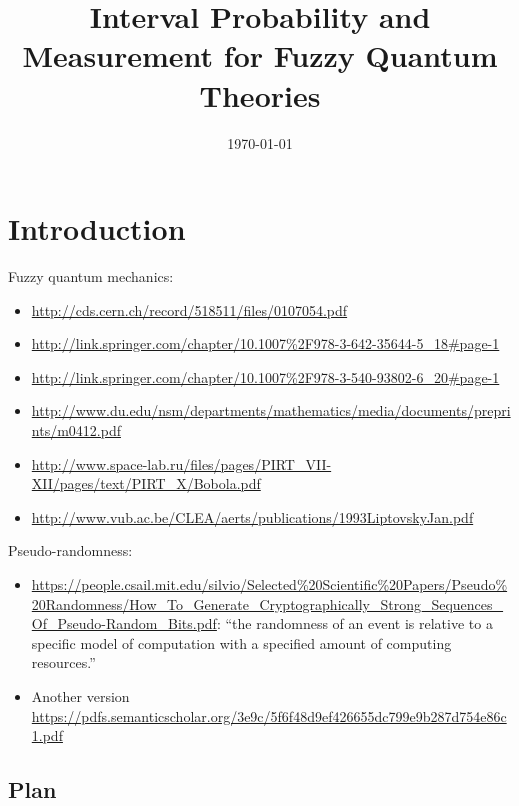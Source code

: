 \documentclass{article}
\theoremstyle{remark}
\begin{document}
\title{Interval Probability and Measurement for Fuzzy Quantum Theories}
\author{}
\date{\today}
\maketitle

\section{Introduction}
  
Fuzzy quantum mechanics:
\begin{itemize}
\item \url{http://cds.cern.ch/record/518511/files/0107054.pdf}
\item \url{http://link.springer.com/chapter/10.1007%2F978-3-642-35644-5_18#page-1}
\item \url{http://link.springer.com/chapter/10.1007%2F978-3-540-93802-6_20#page-1}
\item \url{http://www.du.edu/nsm/departments/mathematics/media/documents/preprints/m0412.pdf}
\item \url{http://www.space-lab.ru/files/pages/PIRT_VII-XII/pages/text/PIRT_X/Bobola.pdf}
\item \url{http://www.vub.ac.be/CLEA/aerts/publications/1993LiptovskyJan.pdf}
\end{itemize}

\noindent Pseudo-randomness:
\begin{itemize}
\item
  \url{https://people.csail.mit.edu/silvio/Selected%20Scientific%20Papers/Pseudo%20Randomness/How_To_Generate_Cryptographically_Strong_Sequences_Of_Pseudo-Random_Bits.pdf}:
  ``the randomness of an event is relative to a specific model of
  computation with a specified amount of computing resources.''
\item Another version \url{https://pdfs.semanticscholar.org/3e9c/5f6f48d9ef426655dc799e9b287d754e86c1.pdf}
\end{itemize}

\subsection{Plan}
\end{document}
